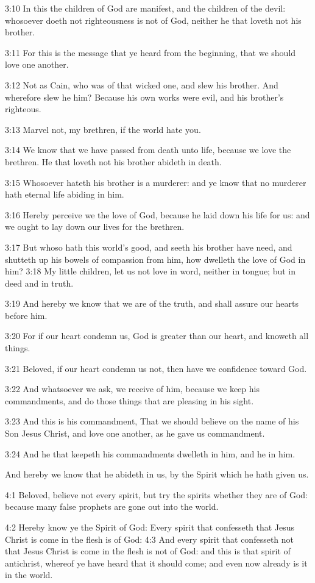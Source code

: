 3:10 In this the children of God are manifest, and the children of the
devil: whosoever doeth not righteousness is not of God, neither he
that loveth not his brother.

3:11 For this is the message that ye heard from the beginning, that we
should love one another.

3:12 Not as Cain, who was of that wicked one, and slew his brother.
And wherefore slew he him? Because his own works were evil, and his
brother's righteous.

3:13 Marvel not, my brethren, if the world hate you.

3:14 We know that we have passed from death unto life, because we love
the brethren. He that loveth not his brother abideth in death.

3:15 Whosoever hateth his brother is a murderer: and ye know that no
murderer hath eternal life abiding in him.

3:16 Hereby perceive we the love of God, because he laid down his life
for us: and we ought to lay down our lives for the brethren.

3:17 But whoso hath this world's good, and seeth his brother have
need, and shutteth up his bowels of compassion from him, how dwelleth
the love of God in him?  3:18 My little children, let us not love in
word, neither in tongue; but in deed and in truth.

3:19 And hereby we know that we are of the truth, and shall assure our
hearts before him.

3:20 For if our heart condemn us, God is greater than our heart, and
knoweth all things.

3:21 Beloved, if our heart condemn us not, then have we confidence
toward God.

3:22 And whatsoever we ask, we receive of him, because we keep his
commandments, and do those things that are pleasing in his sight.

3:23 And this is his commandment, That we should believe on the name
of his Son Jesus Christ, and love one another, as he gave us
commandment.

3:24 And he that keepeth his commandments dwelleth in him, and he in
him.

And hereby we know that he abideth in us, by the Spirit which he hath
given us.

4:1 Beloved, believe not every spirit, but try the spirits whether
they are of God: because many false prophets are gone out into the
world.

4:2 Hereby know ye the Spirit of God: Every spirit that confesseth
that Jesus Christ is come in the flesh is of God: 4:3 And every spirit
that confesseth not that Jesus Christ is come in the flesh is not of
God: and this is that spirit of antichrist, whereof ye have heard that
it should come; and even now already is it in the world.

